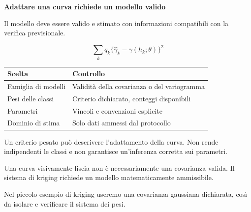 \documentclass[12pt,aspectratio=1610]{beamer}
\newcommand{\PBody}[1]{\par{\fontsize{11.3}{14.8}\selectfont #1\par}}
\newcommand{\PSmall}[1]{\par{\fontsize{9.8}{13.1}\selectfont #1\par}}
\newcommand{\PInfo}[1]{%
\begin{tcolorbox}[enhanced,arc=1.6mm,boxrule=.55pt,colback=GeoTint,
 colframe=Rule!80!Classical,left=2.3mm,right=2.3mm,top=2mm,bottom=2mm,
 before skip=1mm,after skip=1mm]
\PSmall{#1}\end{tcolorbox}}
\begin{document}
\begin{frame}[plain]\hypertarget{slide80}{}
\begin{lrbox}{\TitleBox}
\begin{minipage}[t]{17.7cm}\raggedright\color{Ink}\fontsize{11.3}{14.8}\selectfont
\color{Navy}\bfseries\fontsize{20.6}{24.5}\selectfont Adattare una curva richiede un modello valido
\end{minipage}\end{lrbox}

\begin{lrbox}{\RecallBox}
\begin{minipage}[t]{14.3cm}\raggedright\color{Ink}\fontsize{11.3}{14.8}\selectfont
\fontsize{10.3}{13.8}\selectfont Il modello deve essere valido e stimato con informazioni compatibili con la verifica previsionale.
\end{minipage}\end{lrbox}

\begin{lrbox}{\PilotLeftBox}
\begin{minipage}[t]{10.05cm}\raggedright\color{Ink}\fontsize{11.3}{14.8}\selectfont
\[\sum_k q_k\{\widehat\gamma_k-\gamma(h_k;\theta)\}^2\]
{\fontsize{10.2}{13.1}\selectfont\renewcommand{\arraystretch}{1.45}\begin{tabular}{@{}p{3.4cm}p{5.6cm}@{}}\toprule
\textbf{Scelta} & \textbf{Controllo}\\\midrule
Famiglia di modelli & Validità della covarianza o del variogramma\\
Pesi delle classi & Criterio dichiarato, conteggi disponibili\\
Parametri & Vincoli e convenzioni esplicite\\
Dominio di stima & Solo dati ammessi dal protocollo\\
\bottomrule\end{tabular}}

\end{minipage}\end{lrbox}

\begin{lrbox}{\PilotRightBox}
\begin{minipage}[t]{7.55cm}\raggedright\color{Ink}\fontsize{11.3}{14.8}\selectfont
\PBody{Un criterio pesato può descrivere l’adattamento della curva. Non rende indipendenti le classi e non garantisce un’inferenza corretta sui parametri.}
\vspace{2.5mm}
\PInfo{Una curva visivamente liscia non è necessariamente una covarianza valida. Il sistema di kriging richiede un modello matematicamente ammissibile.}
\PBody{Nel piccolo esempio di kriging useremo una covarianza gaussiana dichiarata, così da isolare e verificare il sistema dei pesi.}
\vspace{2.5mm}


\end{minipage}
\end{lrbox}
\end{frame}
\end{document}
